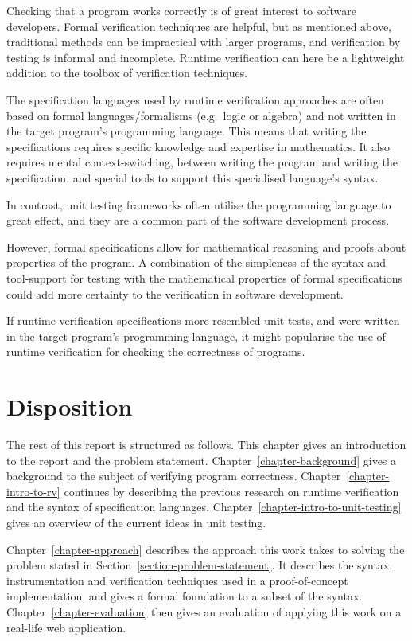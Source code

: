 \documentclass[a4paper,11pt]{kth-mag}
\begin{document}
Checking that a program works correctly is of great interest to software
developers. Formal verification techniques are helpful, but as mentioned above,
traditional methods can be impractical with larger programs, and verification
by testing is informal and incomplete. Runtime verification can here be a
lightweight addition to the toolbox of verification techniques.

The specification languages used by runtime verification approaches are often
based on formal languages/formalisms (e.g.\ logic or algebra) and not written
in the target program's programming language. This means that writing the
specifications requires specific knowledge and expertise in mathematics. It
also requires mental context-switching, between writing the program and writing
the specification, and special tools to support this specialised language's
syntax.

In contrast, unit testing frameworks often utilise the programming language to
great effect, and they are a common part of the software development process.

However, formal specifications allow for mathematical reasoning and proofs
about properties of the program. A combination of the simpleness of the syntax
and tool-support for testing with the mathematical properties of formal
specifications could add more certainty to the verification in software
development.

If runtime verification specifications more resembled unit tests, and were
written in the target program's programming language, it might popularise the
use of runtime verification for checking the correctness of programs.


\section{Disposition}

The rest of this report is structured as follows. This chapter gives an
introduction to the report and the problem statement.
Chapter~\ref{chapter-background} gives a background to the subject of verifying
program correctness. Chapter~\ref{chapter-intro-to-rv} continues by
describing the previous research on runtime verification and the syntax of
specification languages. Chapter~\ref{chapter-intro-to-unit-testing} gives an
overview of the current ideas in unit testing.

Chapter~\ref{chapter-approach} describes the approach this work takes to
solving the problem stated in Section~\ref{section-problem-statement}. It
describes the syntax, instrumentation and verification techniques used in a
proof-of-concept implementation, and gives a formal foundation to a subset of
the syntax. Chapter~\ref{chapter-evaluation} then gives an evaluation of
applying this work on a real-life web application.
\end{document}
